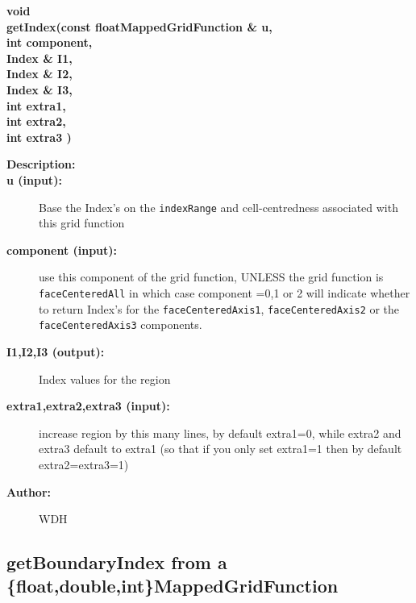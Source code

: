 
\begin{flushleft} \textbf{%
void  \\ 
\settowidth{\OGgetIndexIncludeArgIndent}{getIndex(}%
getIndex(const floatMappedGridFunction \& u, \\ 
\hspace{\OGgetIndexIncludeArgIndent}int component, \\ 
\hspace{\OGgetIndexIncludeArgIndent}Index \& I1, \\ 
\hspace{\OGgetIndexIncludeArgIndent}Index \& I2, \\ 
\hspace{\OGgetIndexIncludeArgIndent}Index \& I3, \\ 
\hspace{\OGgetIndexIncludeArgIndent}int extra1,\\ 
\hspace{\OGgetIndexIncludeArgIndent}int extra2,\\ 
\hspace{\OGgetIndexIncludeArgIndent}int extra3 )
}\end{flushleft}
\begin{description}
\item[{\bf Description:}] 
\item[{\bf u (input):}]  Base the Index's on the {\tt indexRange} and cell-centredness associated   
     with this grid function
\item[{\bf component (input):}]  use this component of the grid function, UNLESS the grid function 
    is {\tt faceCenteredAll} in which case component =0,1 or 2 will indicate whether to return
   Index's for the {\tt faceCenteredAxis1}, {\tt faceCenteredAxis2} or the {\tt faceCenteredAxis3} components.
\item[{\bf I1,I2,I3 (output):}]  Index values for the region
\item[{\bf extra1,extra2,extra3 (input):}]  increase region by this many lines, by default extra1=0, while 
                         extra2 and extra3 default to extra1 (so that if you only set extra1=1
                         then by default extra2=extra3=1)
\item[{\bf Author:}]  WDH
\end{description}
\subsection{getBoundaryIndex from a \{float,double,int\}MappedGridFunction}
 
